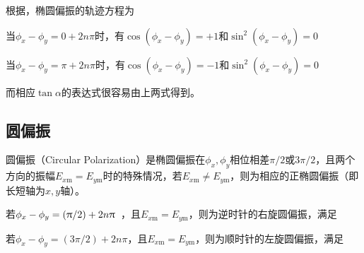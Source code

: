 \begin{Proof}
    根据，椭圆偏振的轨迹方程为
    当$\phi_x-\phi_y=0+2n\pi$时，有$\cos(\phi_x-\phi_y)=+1$和$\sin^2(\phi_x-\phi_y)=0$
    当$\phi_x-\phi_y=\pi+2n\pi$时，有$\cos(\phi_x-\phi_y)=-1$和$\sin^2(\phi_x-\phi_y)=0$
    而相应$\tan\alpha$的表达式很容易由上两式得到。
\end{Proof}

\subsection{圆偏振}
圆偏振（Circular Polarization）是椭圆偏振在$\phi_x,\phi_y$相位相差$\pi/2$或$3\pi/2$，且两个方向的振幅$E_{x\text{m}}=E_{y\text{m}}$时的特殊情况，若$E_{x\text{m}}\neq E_{y\text{m}}$，则为相应的正椭圆偏振（即长短轴为$x,y$轴）。

\begin{BoxFormula}[圆偏振]
    若$\phi_x-\phi_y=(\pi/2)+2n\pi\hphantom{3}$，且$E_{x\text{m}}=E_{y\text{m}}$，则为逆时针的右旋圆偏振，满足
    若$\phi_x-\phi_y=(3\pi/2)+2n\pi$，且$E_{x\text{m}}=E_{y\text{m}}$，则为顺时针的左旋圆偏振，满足
\end{BoxFormula}

